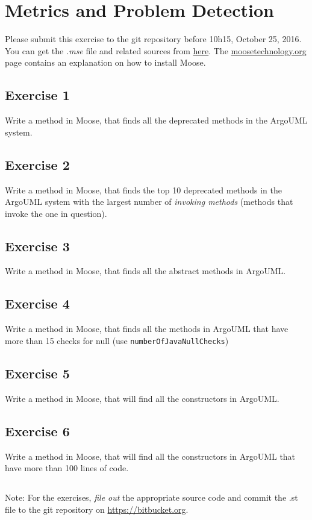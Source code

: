 \documentclass [11pt, a4wide, twoside]{article}
\begin{document}
\section*{Metrics and Problem Detection}


Please submit this exercise to the git repository before 10h15, October 25, 2016.
You can get the \emph{.mse} file and related sources from \href{https://github.com/scg-unibe-ch/moose-demo-data/archive/master.zip}{here}. The \href{http://moosetechnology.org/#install}{moosetechnology.org} page contains an explanation on how to install Moose.

\subsection*{Exercise 1}
Write a method in Moose, that finds all the deprecated methods in the ArgoUML system.

\subsection*{Exercise 2}
Write a method in Moose, that finds the top 10 deprecated methods in the ArgoUML system with the largest number of \emph{invoking methods} (methods that invoke the one in question).

\subsection*{Exercise 3}
Write a method in Moose, that finds all the abstract methods in ArgoUML.

\subsection*{Exercise 4}
Write a method in Moose, that finds all the methods in ArgoUML that have more than 15 checks for null (use {\tt numberOfJavaNullChecks}) 

\subsection*{Exercise 5}
Write a method in Moose, that will find all the constructors in ArgoUML.

\subsection*{Exercise 6}
Write a method in Moose, that will find all the constructors in ArgoUML that have more than 100 lines of code.


\subsection*{}
Note: For the exercises, {\em file out} the appropriate source code and commit the .st file to the git repository on \url{https://bitbucket.org}.
\end{document}
